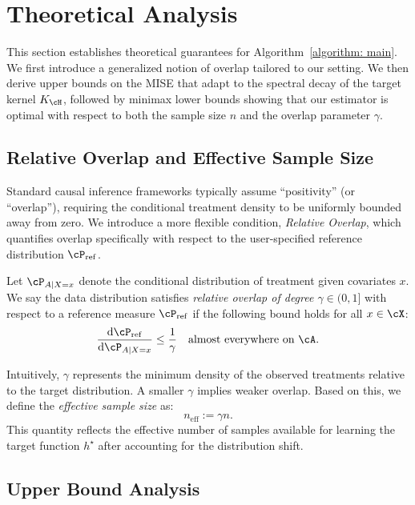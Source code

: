 \documentclass[english,11pt]{article}
\begin{document}
\section{Theoretical Analysis}\label{section: theory}

This section establishes theoretical guarantees for Algorithm~\ref{algorithm: main}. We first introduce a generalized notion of overlap tailored to our setting. We then derive upper bounds on the MISE that adapt to the spectral decay of the target kernel $K_\cH$, followed by minimax lower bounds showing that our estimator is optimal with respect to both the sample size $n$ and the overlap parameter $\gamma$.

\subsection{Relative Overlap and Effective Sample Size}

Standard causal inference frameworks typically assume ``positivity'' (or ``overlap''), requiring the conditional treatment density to be uniformly bounded away from zero. We introduce a more flexible condition, \emph{Relative Overlap}, which quantifies overlap specifically with respect to the user-specified reference distribution $\cP_{\operatorname{ref}}$.

\begin{definition}\label{definition; relative overlap}
    Let $\cP_{A|X=x}$ denote the conditional distribution of treatment given covariates $x$. We say the data distribution satisfies \emph{relative overlap of degree $\gamma \in (0, 1]$} with respect to a reference measure $\cP_{\operatorname{ref}}$ if the following bound holds for all $x \in \cX$:
    \begin{align*}
        \frac{\mathrm{d} \cP_{\operatorname{ref}}}{\mathrm{d} \cP_{A|X=x}} \le \frac{1}{\gamma} \quad \text{almost everywhere on } \cA.
    \end{align*}
\end{definition}

Intuitively, $\gamma$ represents the minimum density of the observed treatments relative to the target distribution. A smaller $\gamma$ implies weaker overlap. Based on this, we define the \emph{effective sample size} as:
\[
    n_{\operatorname{eff}} := \gamma n.
\]
This quantity reflects the effective number of samples available for learning the target function $h^\star$ after accounting for the distribution shift.

\subsection{Upper Bound Analysis}
\end{document}
